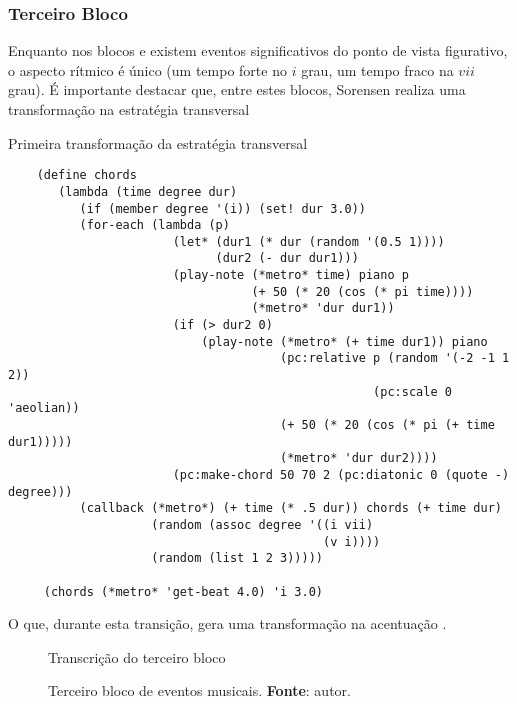 \subsubsection*{Terceiro Bloco}

Enquanto nos blocos  e  existem eventos significativos do ponto de vista figurativo, o aspecto rítmico é único (um tempo forte no $i$ grau, um tempo fraco na $vii$ grau). É importante destacar que, entre estes blocos, Sorensen realiza uma transformação na estratégia transversal

\begin{example}{Primeira transformação da estratégia transversal}
\begin{verbatim}
    (define chords
       (lambda (time degree dur)
          (if (member degree '(i)) (set! dur 3.0))
          (for-each (lambda (p)
                       (let* (dur1 (* dur (random '(0.5 1))))
                             (dur2 (- dur dur1)))
                       (play-note (*metro* time) piano p
                                  (+ 50 (* 20 (cos (* pi time))))
                                  (*metro* 'dur dur1))
                       (if (> dur2 0)
                           (play-note (*metro* (+ time dur1)) piano
                                      (pc:relative p (random '(-2 -1 1 2))
                                                   (pc:scale 0 'aeolian))
                                      (+ 50 (* 20 (cos (* pi (+ time dur1)))))
                                      (*metro* 'dur dur2))))
                       (pc:make-chord 50 70 2 (pc:diatonic 0 (quote -) degree)))
          (callback (*metro*) (+ time (* .5 dur)) chords (+ time dur)
                    (random (assoc degree '((i vii)
                                            (v i))))
                    (random (list 1 2 3)))))
    
     (chords (*metro* 'get-beat 4.0) 'i 3.0)
\end{verbatim}
\end{example}

O que, durante esta transição, gera uma transformação na acentuação .

\begin{figure}{Transcrição do terceiro bloco}
  \centering
  
  \caption{Terceiro bloco de eventos musicais. \textbf{Fonte}: autor.}
  \label{fig:ask4}
\end{figure}

